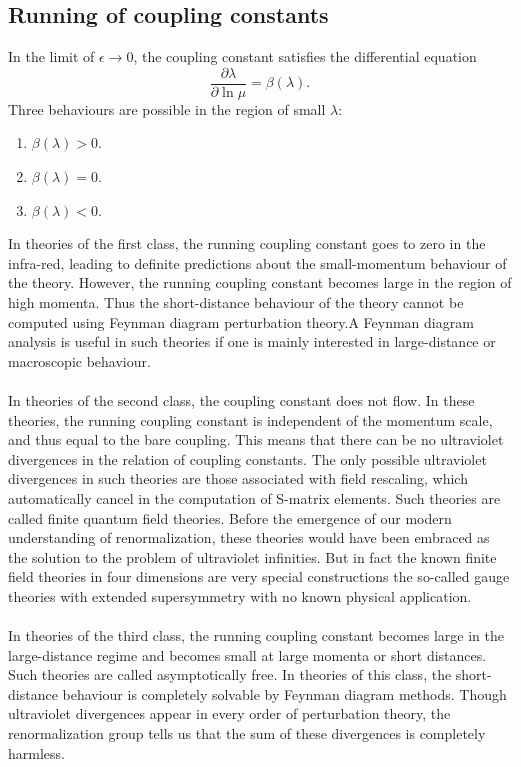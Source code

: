 \subsection{Running of coupling constants}
In the limit of $\epsilon \to 0$, the coupling constant satisfies the differential equation
\[\frac{\partial \lambda}{\partial \ln \mu} = \beta(\lambda).\]
Three behaviours are possible in the region of small $\lambda$:
\begin{enumerate}
\item $\beta(\lambda) > 0$.
\item $\beta(\lambda) = 0$.
\item $\beta(\lambda) < 0$.
\end{enumerate}
\noindent
In theories of the first class, the running coupling constant goes to zero in the infra-red, leading to definite predictions about the small-momentum behaviour of the theory. However, the running coupling constant becomes large in the region of high momenta. Thus the short-distance behaviour of the theory cannot be computed using Feynman diagram perturbation theory.A Feynman diagram analysis is useful in such theories if one is mainly interested in large-distance or macroscopic behaviour.
\\ \\
In theories of the second class, the coupling constant does not flow. In these theories, the running coupling constant is independent of the momentum scale, and thus equal to the bare coupling. This means that there can be no ultraviolet divergences in the relation of coupling constants. The only possible ultraviolet divergences in such theories are those associated with field rescaling, which automatically cancel in the computation of S-matrix elements. Such theories are called finite quantum field theories. Before the emergence of our modern understanding of renormalization, these theories would have been embraced as the solution to the problem of ultraviolet infinities. But in fact the known finite field theories in four dimensions are very special constructions the so-called gauge theories with extended supersymmetry with no known physical application. 
\\ \\
In theories of the third class, the running coupling constant becomes large in the large-distance regime and becomes small at large momenta or short distances. Such theories are called asymptotically free. In theories of this class, the short-distance behaviour is completely solvable by Feynman diagram methods. Though ultraviolet divergences appear in every order of perturbation theory, the renormalization group tells us that the sum of these divergences is completely harmless.

